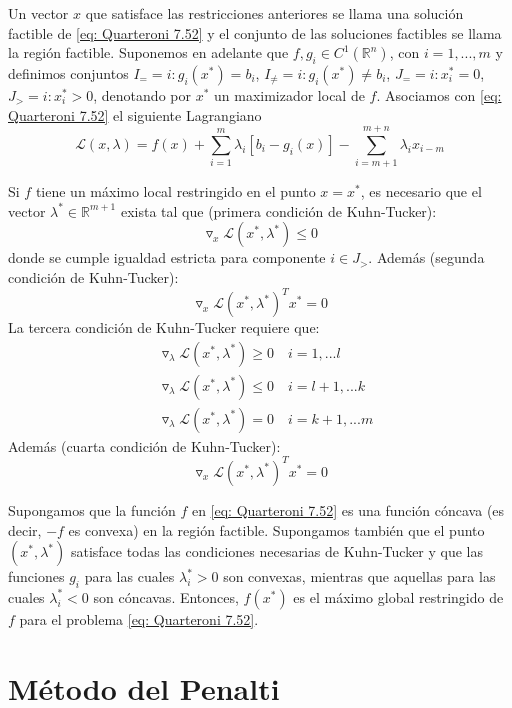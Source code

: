 Un vector $x$ que satisface las restricciones anteriores se llama una solución factible de \ref{eq: Quarteroni 7.52} y el conjunto de las soluciones factibles se llama la región factible. Suponemos en adelante que $f, g_i \in C^1(\mathbb{R}^n)$, con $i = 1,...,m$ y definimos conjuntos $I_= = {i: g_i(x^*) = b_i}$, $I_\neq = {i: g_i(x^*) \neq b_i}$, $J_= = {i: x_i^* = 0}$, $J_> = {i: x_i^* > 0}$, denotando por $x^*$ un maximizador local de $f$. Asociamos con \ref{eq: Quarteroni 7.52} el siguiente Lagrangiano
\[ \mathcal{L}(x, \lambda) = f(x) + \sum_{i = 1}^{m} \lambda_i [b_i - g_i(x)] - \sum_{i = m + 1}^{m+ n} \lambda_i x_{i - m} \]

\begin{property}
    Si $f$ tiene un máximo local restringido en el punto $x = x^*$, es necesario que el vector $\lambda^* \in \mathbb{R}^{m + 1}$ exista tal que (primera condición de Kuhn-Tucker):
    \[ \triangledown _x \mathcal{L}(x^*, \lambda^*) \leq 0 \]
    donde se cumple igualdad estricta para componente $i \in J_>$. Además (segunda condición de Kuhn-Tucker):
    \[ \triangledown_x \mathcal{L} (x^*, \lambda^*)^T x^* = 0 \]
    La tercera condición de Kuhn-Tucker requiere que:
    \begin{align*}
        & \triangledown_\lambda \mathcal{L}(x^*, \lambda^*) \geq 0 \quad i = 1,...l \\
        & \triangledown_\lambda \mathcal{L}(x^*, \lambda^*) \leq 0 \quad i = l + 1,...k \\
        & \triangledown_\lambda \mathcal{L}(x^*, \lambda^*) = 0 \quad i = k + 1,...m
    \end{align*}
    Además (cuarta condición de Kuhn-Tucker):
    \[ \triangledown _x \mathcal{L}(x^*, \lambda^*)^T x^* =  0 \]
\end{property}

\begin{property}
    Supongamos que la función \( f \) en \ref{eq: Quarteroni 7.52} es una función cóncava (es decir, \( -f \) es convexa) en la región factible. Supongamos también que el punto \( (x^*, \lambda^*) \) satisface todas las condiciones necesarias de Kuhn-Tucker y que las funciones \( g_i \) para las cuales \( \lambda^*_i > 0 \) son convexas, mientras que aquellas para las cuales \( \lambda^*_i < 0 \) son cóncavas. Entonces, \( f(x^*) \) es el máximo global restringido de \( f \) para el problema \ref{eq: Quarteroni 7.52}.
\end{property}

\section{Método del Penalti}


